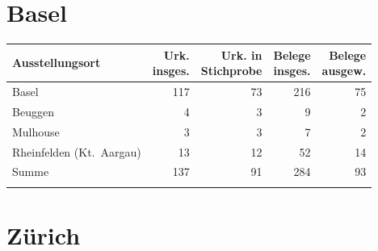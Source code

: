 
\section{Basel}

\begin{tabularx}{\linewidth}{X r r r r}
\lsptoprule
Ausstellungsort
	& \makecell{Urk.\\ insges.}
	& \makecell{Urk. in\\ Stichprobe}
	& \makecell{Belege\\ insges.}
	& \makecell{Belege\\ ausgew.}
	\\
\midrule

Basel
	& 117
	& 73
	& 216
	& 75
	\\

Beuggen
	& 4
	& 3
	& 9
	& 2
	\\

Mulhouse
	& 3
	& 3
	& 7
	& 2
	\\

Rheinfelden (Kt.~Aargau)
	& 13
	& 12
	& 52
	& 14
	\\

\midrule

Summe
	& 137
	& 91
	& 284
	& 93
	\\

\lspbottomrule
\end{tabularx}


\section{Zürich}

